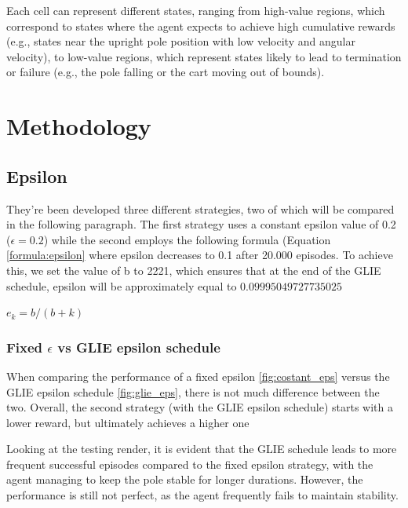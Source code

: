 \documentclass{article}
\begin{document}
Each cell can represent different states, ranging from high-value regions, which correspond to states where the agent expects to achieve high cumulative rewards (e.g., states near the upright pole position with low velocity and angular velocity), to low-value regions, which represent states likely to lead to termination or failure (e.g., the pole falling or the cart moving out of bounds).


\section{Methodology}

\subsection{Epsilon}
They're been developed three different strategies, two of which will be compared in the following paragraph. The first strategy uses a constant epsilon value of 0.2  ($\epsilon =  0.2$) while the second employs the following formula (Equation \ref{formula:epsilon} where epsilon decreases to 0.1 after 20.000 episodes. To achieve this, we set the value of b to 2221, which ensures that at the end of the GLIE schedule, epsilon will be approximately equal to $0.09995049727735025$

\centering
\label{formula:epsilon}
$ e_k = b / (b+k) $ 

\flushleft

\subsubsection{Fixed $\epsilon$ vs GLIE epsilon schedule}
When comparing the performance of a fixed epsilon \ref{fig:costant_eps} versus the GLIE epsilon schedule \ref{fig:glie_eps}, there is not much difference between the two. Overall, the second strategy (with the GLIE epsilon schedule) starts with a lower reward, but ultimately achieves a higher one

Looking at the testing render, it is evident that the GLIE schedule leads to more frequent successful episodes compared to the fixed epsilon strategy, with the agent managing to keep the pole stable for longer durations. However, the performance is still not perfect, as the agent frequently fails to maintain stability.

\end{document}
